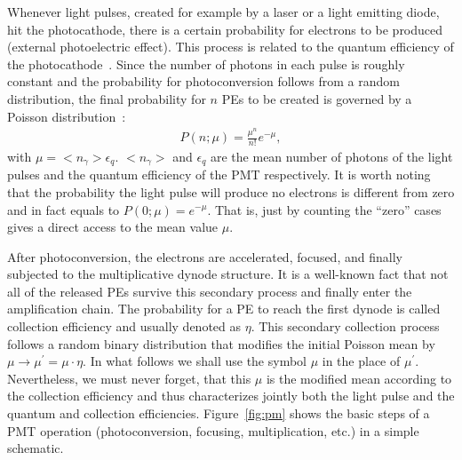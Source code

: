 \documentclass[a4paper,11pt]{article}
\begin{document}
Whenever light pulses, created for example by a laser or a light emitting diode, hit the photocathode, 
there is a certain probability for electrons to be produced (external photoelectric effect).
This process is related to the quantum efficiency %
of the photocathode~\cite{Hama}. 
Since the number of photons in each pulse is roughly constant and the probability for photoconversion follows from a random distribution, 
the final probability for $n$ PEs to be created is governed by a Poisson distribution~\cite{Zorin}: %
\begin{align}
P( n; \mu ) =  \frac{\mu^n}{n!} e^{-\mu}, \label{eq:poisson}
\end{align}
with $\mu= <n_\gamma> \epsilon_q$. 
$<n_\gamma>$ and $\epsilon_q$ are the mean number of photons of the light pulses and the quantum efficiency of the PMT respectively. 
It is worth noting that the probability the light pulse will produce no electrons is different from zero and in fact equals to $P(0;\mu) = e^{-\mu}$.
That is, just by counting the ``zero'' cases gives a direct access to the mean value $\mu$. %

After photoconversion, the electrons are accelerated, focused, and finally subjected to the multiplicative dynode structure. 
It is a well-known fact that not all of the released PEs survive this secondary process and finally enter the amplification chain. 
The probability for a PE to reach the first dynode is called collection efficiency and usually denoted as $\eta$. 
This secondary collection process follows a random binary distribution that modifies the initial Poisson mean by $\mu \rightarrow \mu^\prime = \mu \cdot \eta$. 
In what follows we shall use the symbol $\mu$ in the place of $\mu^\prime$.  
Nevertheless, we must never forget, that this $\mu$ is the modified mean according to the collection efficiency and thus characterizes jointly both the light pulse and the quantum and collection efficiencies.
Figure~\ref{fig:pm} shows the basic steps of a PMT operation (photoconversion, focusing, multiplication, etc.) in a simple schematic. 
\end{document}

